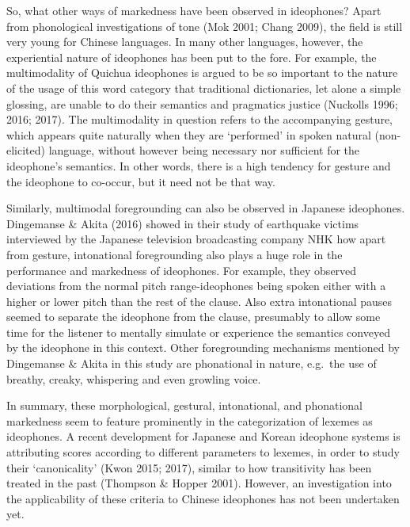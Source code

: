 So, what other ways of markedness have been observed in ideophones?
Apart from phonological investigations of tone (Mok 2001; Chang 2009),
the field is still very young for Chinese languages. In many other
languages, however, the experiential nature of ideophones has been put
to the fore. For example, the multimodality of Quichua ideophones is
argued to be so important to the nature of the usage of this word
category that traditional dictionaries, let alone a simple glossing, are
unable to do their semantics and pragmatics justice (Nuckolls 1996;
2016; 2017). The multimodality in question refers to the accompanying
gesture, which appears quite naturally when they are `performed' in
spoken natural (non-elicited) language, without however being necessary
nor sufficient for the ideophone's semantics. In other words, there is a
high tendency for gesture and the ideophone to co-occur, but it need not
be that way.

Similarly, multimodal foregrounding can also be observed in Japanese
ideophones. Dingemanse \& Akita (2016) showed in their study of
earthquake victims interviewed by the Japanese television broadcasting
company NHK how apart from gesture, intonational foregrounding also
plays a huge role in the performance and markedness of ideophones. For
example, they observed deviations from the normal pitch range-ideophones
being spoken either with a higher or lower pitch than the rest of the
clause. Also extra intonational pauses seemed to separate the ideophone
from the clause, presumably to allow some time for the listener to
mentally simulate or experience the semantics conveyed by the ideophone
in this context. Other foregrounding mechanisms mentioned by Dingemanse
\& Akita in this study are phonational in nature, e.g.~the use of
breathy, creaky, whispering and even growling voice.

In summary, these morphological, gestural, intonational, and phonational
markedness seem to feature prominently in the categorization of lexemes
as ideophones. A recent development for Japanese and Korean ideophone
systems is attributing scores according to different parameters to
lexemes, in order to study their `canonicality' (Kwon 2015; 2017),
similar to how transitivity has been treated in the past (Thompson \&
Hopper 2001). However, an investigation into the applicability of these
criteria to Chinese ideophones has not been undertaken yet.

